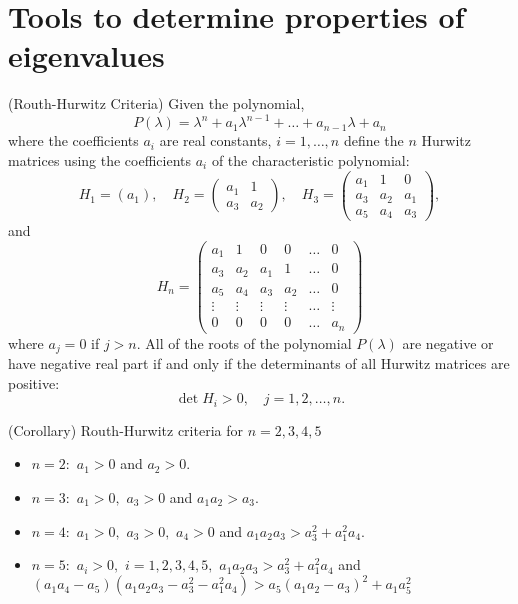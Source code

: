 \chapter{Tools to determine properties of eigenvalues}
\begin{atheorem}(Routh-Hurwitz Criteria)
Given the polynomial,
$$P(\lambda)=\lambda ^n + a_1 \lambda ^{n-1}+\dots + a_{n-1}\lambda +a_n$$
where the coefficients $a_i$ are real constants, $i=1,\dots , n$ define the $n$ Hurwitz matrices using the coefficients $a_i$ of the characteristic polynomial:
$$H_1=(a_1),\quad H_2=\left (\begin{array}{cc}a_1 & 1 \\ a_3 &a_2\end{array}\right), \quad H_3=\left (\begin{array}{ccc}a_1 & 1 & 0 \\ a_3 &a_2 &a_1 \\ a_5& a_4 & a_3\end{array}\right),$$
and
$$H_n=\left (\begin{array}{cccccc}a_1 & 1 & 0 & 0 & \dots &0\\ a_3& a_2 & a_1 & 1 & \dots & 0 \\ a_5 & a_4 & a_3 & a_2 & \dots &0\\\vdots & \vdots & \vdots & \vdots & \dots & \vdots \\ 0 & 0& 0& 0& \dots & a_n\end{array}\right )$$
where $a_j=0$ if $j>n$. All of the roots of the polynomial $P(\lambda)$ are negative or have negative real part if and only if the determinants of all Hurwitz matrices are positive:
$$\det H_i>0, \quad j=1,2,\dots, n.$$
\end{atheorem}



\begin{atheorem}(Corollary)
Routh-Hurwitz criteria for $n=2,3,4,5$
\begin{itemize}
\item $n=2:$ $a_1>0$ and $a_2>0$.
\item $n=3:$ $a_1>0,$ $a_3>0$ and $a_1a_2>a_3$.
\item $n=4:$ $a_1>0,$ $a_3>0,$ $a_4>0$  and $a_1a_2a_3>a_3^2+a_1^2a_4$.
\item $n=5:$ $a_i>0,$ $i=1,2,3,4,5,$ $a_1a_2a_3>a_3^2+a_1^2a_4$ and $(a_1a_4-a_5)(a_1a_2a_3-a_3^2-a_1^2a_4)>a_5(a_1a_2-a_3)^2+a_1a_5^2$
\end{itemize}
\end{atheorem}



